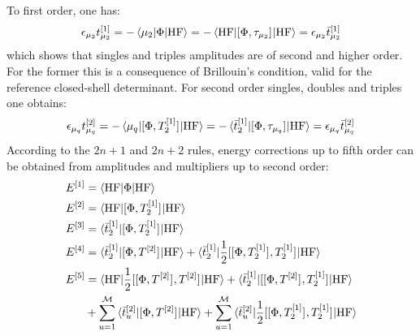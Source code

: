 To first order, one has:
\begin{equation}\label{eq:1st-order}
  \epsilon_{\mu_2}t_{\mu_2}^{[1]}
  = - \braket{\mu_2 | \Phi | \mathrm{HF}}
  = - \braket{\mathrm{HF} | [ \Phi, \tau_{\mu_2} ]^{} |
  \mathrm{HF}}
  = \epsilon_{\mu_2}\bar{t}_{\mu_2}^{[1]}
\end{equation}
which shows that singles and triples amplitudes are of second and higher
order.
For the former this is a consequence of Brillouin's condition, valid for
the reference closed-shell determinant.
For second order singles, doubles and triples one obtains:
\begin{equation}\label{eq:2nd-order}
  \epsilon_{\mu_q}t_{\mu_q}^{[2]}
  = - \braket{\mu_q | [ \Phi, T_2^{[1]} ]^{} | \mathrm{HF}}
  = - \braket{\bar{t}_{2}^{[1]} | [ \Phi, \tau_{\mu_q} ]^{} |
  \mathrm{HF}}
  = \epsilon_{\mu_q}\bar{t}_{\mu_q}^{[2]}
\end{equation}
According to the $2n+1$ and $2n+2$ rules, energy corrections up to fifth
order can be obtained from amplitudes and multipliers up to second
order:
\begin{subequations}\label{eq:mbpt-energies}
  \begin{align}
    E^{[1]}
    &= \braket{\mathrm{HF} | \Phi | \mathrm{HF}} \label{eq:mbpt-1st} \\
    E^{[2]}
    &= \braket{\mathrm{HF} | [ \Phi, T_2^{[1]} ]^{} | \mathrm{HF}} \label{eq:mbpt-2nd} \\
    E^{[3]}
    &= \braket{\bar{t}_{2}^{[1]} | [ \Phi, T_2^{[1]} ]^{} | \mathrm{HF}} \label{eq:mbpt-3rd} \\
    E^{[4]} &= \braket{\bar{t}_{2}^{[1]} | [ \Phi, T^{[2]} ]^{} |
    \mathrm{HF} }
    +
    \braket{\bar{t}_{2}^{[1]} | \frac{1}{2}[ [ \Phi, T_2^{[1]} ]^{}, T_2^{[1]} ]^{}|
    \mathrm{HF} } \label{eq:mbpt-4th} \\
    E^{[5]} &=
    \braket{\mathrm{HF} | \frac{1}{2}[ [ \Phi, T^{[2]} ]^{}, T^{[2]} ]^{}|\mathrm{HF} }
    + \braket{\bar{t}_{2}^{[1]} |
    [ [ \Phi, T^{[2]} ]^{}, T_2^{[1]} ]^{}
    | \mathrm{HF} } \nonumber \\
    &+ \sum_{u=1}^\mathcal{M}
    \braket{\bar{t}_{u}^{[2]} | [ \Phi, T^{[2]} ]^{}|
    \mathrm{HF} }
    +\sum_{u=1}^\mathcal{M}
    \braket{\bar{t}_{u}^{[2]} | \frac{1}{2}[ [ \Phi, T_2^{[1]} ]^{}, T_2^{[1]} ]^{}|
    \mathrm{HF} } \label{eq:mbpt-5th}
  \end{align}
\end{subequations}


